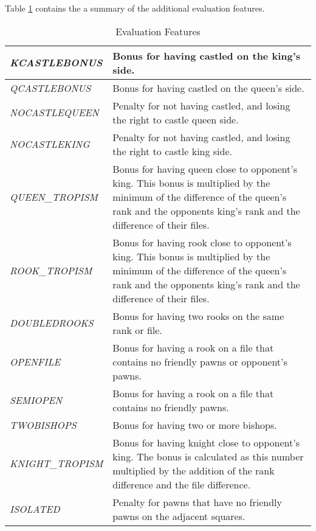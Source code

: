 \documentclass{article}
\begin{document}
Table \ref{eval} contains the a summary of the additional evaluation
features. 

\def\feature#1#2{{\em #1} & #2 \\ \hline}

\begin{table}[hpbf]
\caption{Evaluation Features}
\label{eval}
\begin{center}
\begin{tabular}{|lp{8cm}|}

\hline

\feature{KCASTLEBONUS}{Bonus for having castled on the king's side.}
        
\feature{QCASTLEBONUS}{Bonus for having castled on the queen's side.}
        
\feature{NOCASTLEQUEEN}{Penalty for not having castled, and losing the
right to castle queen side.}
        
\feature{NOCASTLEKING}{Penalty for not having castled, and losing the
        right to castle king side.}

\feature{QUEEN\_TROPISM}{
        Bonus for having queen close to opponent's king.  This bonus
        is multiplied by the minimum of the difference of the queen's
        rank and the opponents king's rank and the difference of their
        files.}
        
\feature{ROOK\_TROPISM}{
        Bonus for having rook close to opponent's king.  This bonus
        is multiplied by the minimum of the difference of the queen's
        rank and the opponents king's rank and the difference of their
        files.}
    
\feature{DOUBLEDROOKS}{
        Bonus for having two rooks on the same rank or file.}
        
\feature{OPENFILE}{
        Bonus for having a rook on a file that contains no friendly
        pawns or opponent's pawns.}
        
\feature{SEMIOPEN}{
        Bonus for having a rook on a file that contains no friendly
        pawns.}
        
\feature{TWOBISHOPS}{
        Bonus for having two or more bishops.}
        
\feature{KNIGHT\_TROPISM}{
        Bonus for having knight close to opponent's king.  The bonus 
        is calculated as this number multiplied by the addition of the 
        rank difference and the file difference.}
        
\feature{ISOLATED}{
        Penalty for pawns that have no friendly pawns on the adjacent
        squares.}
        

\end{tabular}
\end{center}
\end{table}
\end{document}
